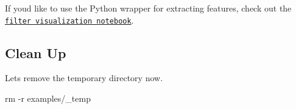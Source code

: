 If you\textquotesingle{}d like to use the Python wrapper for extracting features, check out the \href{http://nbviewer.ipython.org/github/BVLC/caffe/blob/master/examples/00-classification.ipynb}{\tt filter visualization notebook}.

\subsection*{Clean Up }

Let\textquotesingle{}s remove the temporary directory now. \begin{DoxyVerb}rm -r examples/_temp\end{DoxyVerb}
 